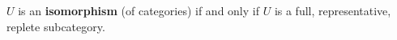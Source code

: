 $U$ is an \textbf{isomorphism} (of categories) if and only if $U$ is a full, representative, replete subcategory.
